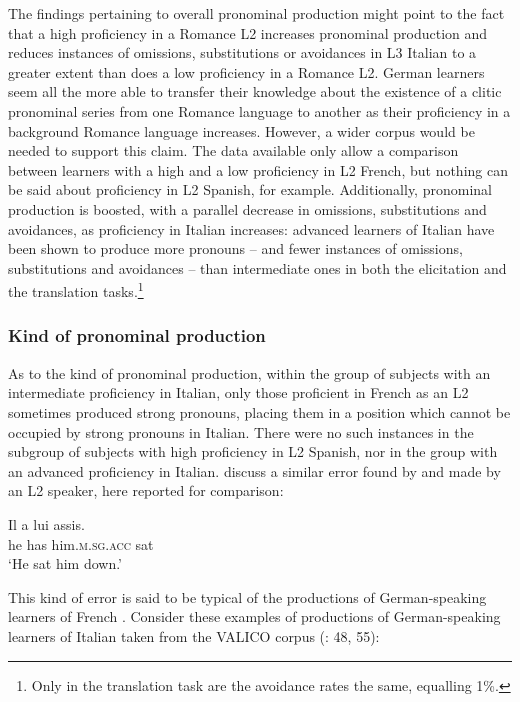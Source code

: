 \documentclass[output=paper,modfonts,nonflat,newtxmath]{langsci/langscibook}
\begin{document}
The findings pertaining to overall pronominal production might point to the fact that a high proficiency in a Romance L2 increases pronominal production and reduces instances of omissions, substitutions or avoidances in L3 Italian to a greater extent than does a low proficiency in a Romance L2. German learners seem all the more able to transfer their knowledge about the existence of a clitic pronominal series from one Romance language to another as their proficiency in a background Romance language increases. However, a wider corpus would be needed to support this claim. The data available only allow a comparison between learners with a high and a low proficiency in L2 French, but nothing can be said about proficiency in L2 Spanish, for example. Additionally, pronominal production is boosted, with a parallel decrease in omissions, substitutions and avoidances, as proficiency in Italian increases: advanced learners of Italian have been shown to produce more pronouns – and fewer instances of omissions, substitutions and avoidances – than intermediate ones in both the elicitation and the translation tasks.\footnote{ \textrm{Only in the translation task are the avoidance rates the same, equalling 1\%.}}

\subsubsection{Kind {of} {pronominal} production} %

As to the kind of pronominal production, within the group of subjects with an intermediate proficiency in Italian, only those proficient in French as an L2 sometimes produced strong pronouns, placing them in a position which cannot be occupied by strong pronouns in Italian. There were no such instances in the subgroup of subjects with high proficiency in L2 Spanish, nor in the group with an advanced proficiency in Italian. \citet{HamannBelletti2006} discuss a similar error found by \citet[355]{GranfeldtSchlyter2004} and made by an L2 speaker, here reported for comparison:

\ea \label{ex:sciutti:37}
    \gll    Il a lui assis.\\
            he has him.\textsc{m.sg.acc} sat\\
    \glt  ‘He sat him down.’
\z{}

This kind of error is said to be typical of the productions of German-speaking learners of French \citep{Herschensohn2004}. Consider these examples of productions of German-speaking learners of Italian taken from the VALICO corpus (\citealt{Corino2012}: 48, 55):
\end{document}
